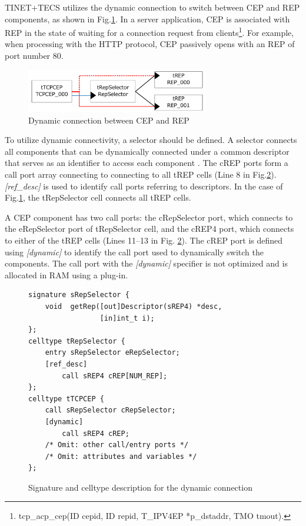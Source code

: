 \documentclass[a4j,12pt,oneside,openany,english]{jsbook}
\begin{document}
TINET+TECS utilizes the dynamic connection to switch between CEP and REP components, as shown in Fig.\ref{fig:DynamicConnectionUseCase}.
In a server application, CEP is associated with REP in the state of waiting for a connection request from clients\footnote{tcp\_acp\_cep(ID cepid, ID repid, T\_IPV4EP *p\_dstaddr, TMO tmout).}.
For example, when processing with the HTTP protocol, CEP passively opens with an REP of port number 80.

\begin{figure}[t]
    \centering
    \includegraphics[width=8.0cm,clip]{figure/DynamicConnectionUseCase.pdf}
    \caption{Dynamic connection between CEP and REP}
    \label{fig:DynamicConnectionUseCase}
\end{figure}

To utilize dynamic connectivity, a selector should be defined.
A selector connects all components that can be dynamically connected under a common descriptor that serves as an identifier to access each component \cite{par:optimization}.
The cREP ports form a call port array connecting to connecting to all tREP cells (Line 8 in Fig.\ref{src:DynamicCDLcode}).
{\it [ref\_desc]} is used to identify call ports referring to descriptors. 
In the case of Fig.\ref{fig:DynamicConnectionUseCase}, the tRepSelector cell connects all tREP cells.

A CEP component has two call ports: the cRepSelector port, which connects to the eRepSelector port of tRepSelector cell, and the cREP4 port, which connects to either of the tREP cells (Lines 11--13 in Fig. \ref{src:DynamicCDLcode}).
The cREP port is defined using {\it [dynamic]} to identify the call port used to dynamically switch the components.
The call port with the {\it [dynamic]} specifier is not optimized and is allocated in RAM using a plug-in.

\begin{figure}[t]
\centering
\begin{lstlisting}
signature sRepSelector {
    void  getRep([out]Descriptor(sREP4) *desc,
                 [in]int_t i);
};
celltype tRepSelector {
    entry sRepSelector eRepSelector;
    [ref_desc]
        call sREP4 cREP[NUM_REP];
};
celltype tTCPCEP {
    call sRepSelector cRepSelector;
    [dynamic]
        call sREP4 cREP;
    /* Omit: other call/entry ports */
    /* Omit: attributes and variables */
};
\end{lstlisting}
\caption{Signature and celltype description for the dynamic connection}
\label{src:DynamicCDLcode}
\end{figure}
\end{document}
